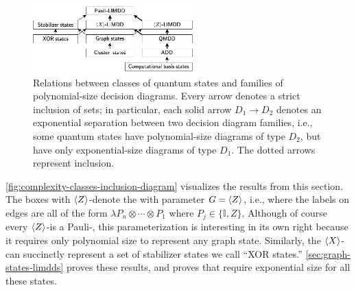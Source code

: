 \begin{figure}
    \vspace{-1em}
	\includegraphics[width=0.55\textwidth]{pics/complexity-inclusion-diagram-no-torus.pdf}
	\caption{
	    \label{fig:complexity-classes-inclusion-diagram}
        Relations between classes of quantum states and families of polynomial-size decision diagrams.
        Every arrow denotes a strict inclusion of sets; in particular, each solid arrow $D_1\to D_2$ denotes an exponential separation between two decision diagram families, i.e., some quantum states have polynomial-size diagrams of type $D_2$, but have only exponential-size diagrams of type $D_1$. The dotted arrows represent inclusion.
    }
\end{figure}

\autoref{fig:complexity-classes-inclusion-diagram} visualizes the results from this section.
The boxes with $\braket{Z}$-\limdd denote the \limdd with parameter \mbox{$G=\braket{Z}$}, i.e., \limdds where the labels on edges are all of the form \mbox{$\lambda P_n\otimes\cdots\otimes P_1$} where \mbox{$P_j\in \{\mathbb I, Z\}$}.
Although of course every $\braket{Z}$-\limdd is a Pauli-\limdd, this parameterization is interesting in its own right because it requires only polynomial size to represent any graph state.
Similarly, the $\braket{X}$-\limdd can succinctly represent a set of stabilizer states we call ``XOR states.''
\autoref{sec:graph-states-limdds} proves these results, and proves that \qmdds require exponential size for all these states. 




